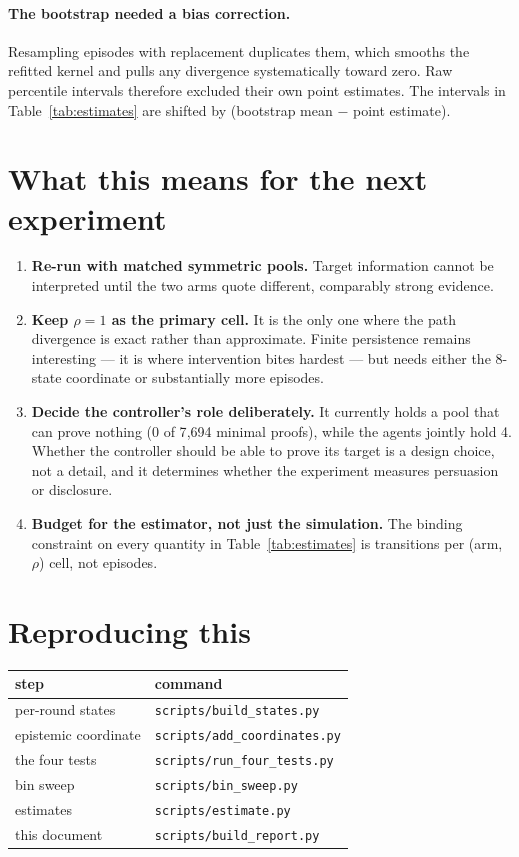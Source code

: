 \documentclass[11pt,a4paper]{article}
\begin{document}
\paragraph{The bootstrap needed a bias correction.} Resampling episodes with
replacement duplicates them, which smooths the refitted kernel and pulls any
divergence systematically toward zero. Raw percentile intervals therefore
excluded their own point estimates. The intervals in
Table~\ref{tab:estimates} are shifted by (bootstrap mean $-$ point estimate).

\section{What this means for the next experiment}

\begin{enumerate}
  \item \textbf{Re-run with matched symmetric pools.} Target information cannot
        be interpreted until the two arms quote different, comparably strong
        evidence.
  \item \textbf{Keep $\rho = 1$ as the primary cell.} It is the only one where
        the path divergence is exact rather than approximate. Finite persistence
        remains interesting --- it is where intervention bites hardest --- but
        needs either the 8-state coordinate or substantially more episodes.
  \item \textbf{Decide the controller's role deliberately.} It currently holds a
        pool that can prove nothing (0 of 7{,}694 minimal proofs), while the
        agents jointly hold 4. Whether the controller should be able to prove its
        target is a design choice, not a detail, and it determines whether the
        experiment measures persuasion or disclosure.
  \item \textbf{Budget for the estimator, not just the simulation.} The binding
        constraint on every quantity in Table~\ref{tab:estimates} is transitions
        per (arm, $\rho$) cell, not episodes.
\end{enumerate}

\section*{Reproducing this}

\begin{center}
\small
\begin{tabular}{ll}
\toprule
step & command \\
\midrule
per-round states & \texttt{scripts/build\_states.py} \\
epistemic coordinate & \texttt{scripts/add\_coordinates.py} \\
the four tests & \texttt{scripts/run\_four\_tests.py} \\
bin sweep & \texttt{scripts/bin\_sweep.py} \\
estimates & \texttt{scripts/estimate.py} \\
this document & \texttt{scripts/build\_report.py} \\
\bottomrule
\end{tabular}
\end{center}
\end{document}
